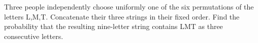 Three people independently choose uniformly one of the six permutations of the letters L,M,T. Concatenate their three strings in their fixed order. Find the probability that the resulting nine-letter string contains LMT as three consecutive letters.
